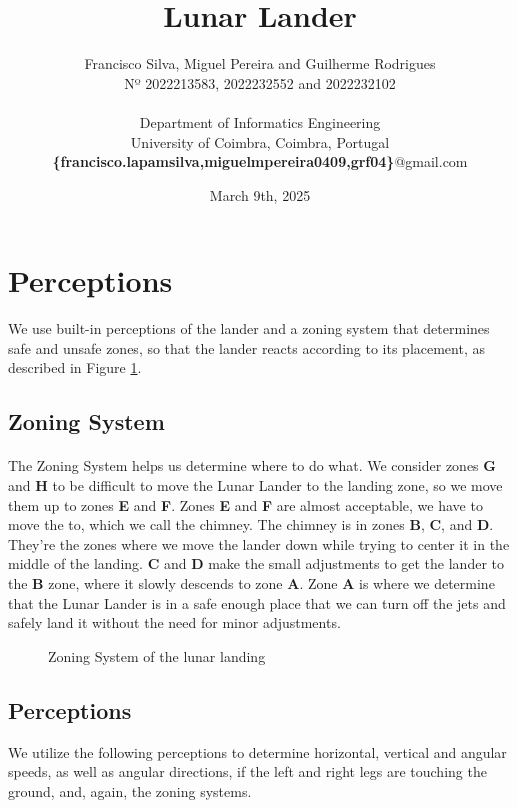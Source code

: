 \documentclass{article}
\title{\textbf{Lunar Lander}}
\subtitle{Project #1 for Artificial Intelligence Fundamentals}
\author{Francisco Silva, Miguel Pereira and Guilherme Rodrigues 
\\ Nº 2022213583, 2022232552 and 2022232102 \\ \\
Department of Informatics Engineering \\
University of Coimbra, Coimbra, Portugal
\\ \textbf{\{francisco.lapamsilva,miguelmpereira0409,grf04\}}@gmail.com}
\date{March 9th, 2025}
\begin{document}
\maketitle

\newpage
\tableofcontents
\newpage

\section{Perceptions}
We use built-in perceptions of the lander and a zoning system that determines safe and unsafe zones, so that the lander reacts according to its placement, as described in Figure \ref{fig:zoningsystem}.
\subsection{Zoning System}
\paragraph{}The Zoning System helps us determine where to do what. We consider zones \textbf{G} and \textbf{H} to be difficult to move the Lunar Lander to the landing zone, so we move them up to zones \textbf{E} and \textbf{F}. Zones \textbf{E} and \textbf{F} are almost acceptable, we have to move the to, which we call the chimney.  The chimney is in zones \textbf{B}, \textbf{C}, and \textbf{D}. They're the zones where we move the lander down while trying to center it in the middle of the landing. \textbf{C} and \textbf{D} make the small adjustments to get the lander to the \textbf{B} zone, where it slowly descends to zone \textbf{A}.  Zone \textbf{A} is where we determine that the Lunar Lander is in a safe enough place that we can turn off the jets and safely land it without the need for minor adjustments.

\begin{figure}[htbp]
\centering

\caption{\label{fig:zoningsystem}Zoning System of the lunar landing}
\end{figure}

\subsection{Perceptions}
We utilize the following perceptions to determine horizontal, vertical and angular speeds, as well as angular directions, if the left and right legs are touching the ground, and, again, the zoning systems.
\end{document}
